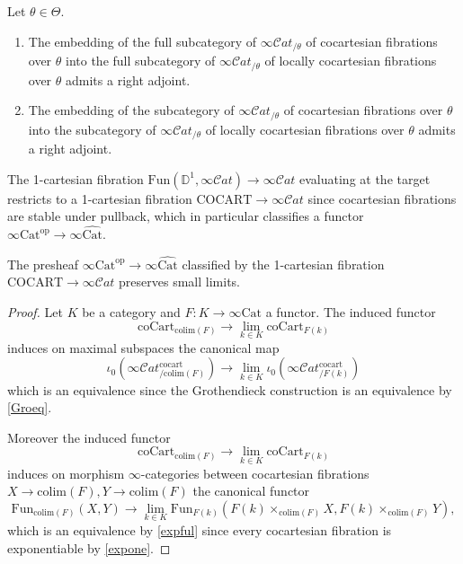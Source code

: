 \documentclass[10pt,oneside]{article}
\numberwithin{equation}{section} %
\numberwithin{figure}{section} %
\theoremstyle{plain}
\theoremstyle{definition}
\newcommand{\bD}{{\mathbb D}}
\newcommand{\op}{\mathrm{op}}
\newcommand{\colim}{\mathrm{colim}}
\newcommand{\Cat}{\mathrm{Cat}}
\newcommand{\Fun}{\mathrm{Fun}}
\newcommand{\cocart}{{\mathrm{cocart}}}
\newcommand{\scat}{\mathcal{C}\mathit{at}}
\begin{document}
\begin{corollary}\label{thetaadj} Let $\theta \in \Theta$.

\begin{enumerate}[\normalfont(1)]\setlength{\itemsep}{-2pt}
\item The embedding of the full subcategory of $\infty\scat_{/\theta}$ of cocartesian fibrations over $\theta$ into the full subcategory of $\infty\scat_{/\theta}$ of locally cocartesian fibrations over $\theta$
admits a right adjoint.

\item The embedding of the subcategory of $\infty\scat_{/\theta}$ of cocartesian fibrations over $\theta$ into the subcategory of $\infty\scat_{/\theta}$ of locally cocartesian fibrations over $\theta$
admits a right adjoint.

\end{enumerate}
    
\end{corollary}

The 1-cartesian fibration $\Fun(\bD^1, \infty\scat) \to \infty\scat$ evaluating at the target restricts to a 1-cartesian fibration
$ \mathrm{COCART} \to \infty\scat $ since cocartesian fibrations are stable under pullback, which in particular classifies a functor $\infty\Cat^\op \to \infty\widehat{\Cat}.$

\begin{corollary}

The presheaf $\infty\Cat^\op \to \infty\widehat{\Cat}$ classified by the 1-cartesian fibration $\mathrm{COCART} \to \infty\scat$ preserves small limits.
    
\end{corollary}

\begin{proof}

Let $K$ be a category and $F: K \to \infty\Cat $ a functor.
The induced functor
$$ \mathrm{coCart}_{\colim(F)} \to \lim_{k \in K} \mathrm{coCart}_{F(k)} $$ induces on maximal subspaces the
canonical map
$$ \iota_0(\infty\scat^\cocart_{/\colim(F)}) \to \lim_{k \in K}  \iota_0(\infty\scat^\cocart_{/F(k)}) $$
which is an equivalence since the Grothendieck construction is an equivalence by \cref{Groeq}.

Moreover the induced functor
$$ \mathrm{coCart}_{\colim(F)} \to \lim_{k \in K}  \mathrm{coCart}_{F(k)} $$ induces on morphism $\infty$-categories between
cocartesian fibrations $X \to \colim(F), Y \to \colim(F) $
the canonical functor
$$ \Fun_{\colim(F)}(X,Y) \to \lim_{k \in K} \Fun_{F(k)}(F(k) \times_{\colim(F)} X, F(k) \times_{\colim(F)} Y), $$
which is an equivalence by \cref{expful} since every cocartesian fibration is exponentiable by \cref{expone}.
\end{proof}
\end{document}
